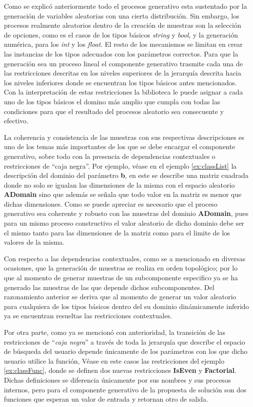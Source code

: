 Como se explicó anteriormente todo el procesos generativo esta sustentado por la generación de variables aleatorias
con una cierta distribución. Sin embargo, los procesos realmente aleatorios dentro de la creación de muestras son la
selección de opciones, como es el casos de los tipos básicos {\it string} y {\it bool}, y la generación numérica, para los {\it int} y los
{\it float}. El resto de los mecanismos se limitan en crear las instancias de los tipos adecuados con los parámetros correctos. Para que
la generación sea un proceso lineal el componente generativo trasmite cada una de las restricciones descritas en los niveles
superiores de la jerarquía descrita hacia los niveles inferiores donde se encuentran los tipos básicos antes mencionados.
Con la interpretación de estas restricciones la biblioteca le puede asignar a cada uno de los tipos básicos el domino más
amplio que cumpla con todas las condiciones para que el resultado del procesos aleatorio sea consecuente y efectivo.

La coherencia y consistencia de las muestras con sus respectivas descripciones es uno de los temas más importantes de los que
se debe encargar el componente generativo, sobre todo con la presencia de dependencias contextuales o restricciones de
``caja negra''. Por ejemplo, véase en el ejemplo \ref{ex:classList} la descripción del dominio del parámetro {\bf b}, en este se describe una matriz cuadrada
donde no solo se igualan las dimensiones de la misma con el espacio aleatorio {\bf ADomain} sino que además se señala que todo
valor en la matriz es menor que dichas dimensiones. Como se puede apreciar es necesario que el proceso generativo sea coherente
y robusto con las muestras del dominio {\bf ADomain}, pues para un mismo proceso constructivo el valor aleatorio de dicho dominio
debe ser el mismo tanto para las dimensiones de la matriz como para el limite de los valores de la misma.

Con respecto a las dependencias contextuales, como se a mencionado en diversas ocasiones, que la generación de muestras se realiza
en orden topológico; por lo que al momento de generar muestras de un subcomponente especifico ya se ha
generado las muestras de las que depende dichos subcomponentes. Del razonamiento anterior se deriva que al momento de generar
un valor aleatorio para cualquiera de los tipos básicos dentro del su dominio dinámicamente inferido ya se encuentran resueltas
las restricciones contextuales.

Por otra parte, como ya se mencionó con anterioridad, la transición de las restricciones de “{\it caja negra}” a través de
toda la jerarquía que describe el espacio de búsqueda del usuario depende únicamente de los parámetros con los que
dicho usuario utilice la función, Véase en este casos las restricciones del ejemplo \ref{ex:classFunc}, donde se definen dos nuevas
restricciones {\bf IsEven} y {\bf Factorial}. Dichas definiciones se diferencia únicamente por sus nombres y sus procesos internos,
pero para el componente generativo de la propuesta de solución son dos funciones que esperan un valor de entrada y
retornan otro de salida.

